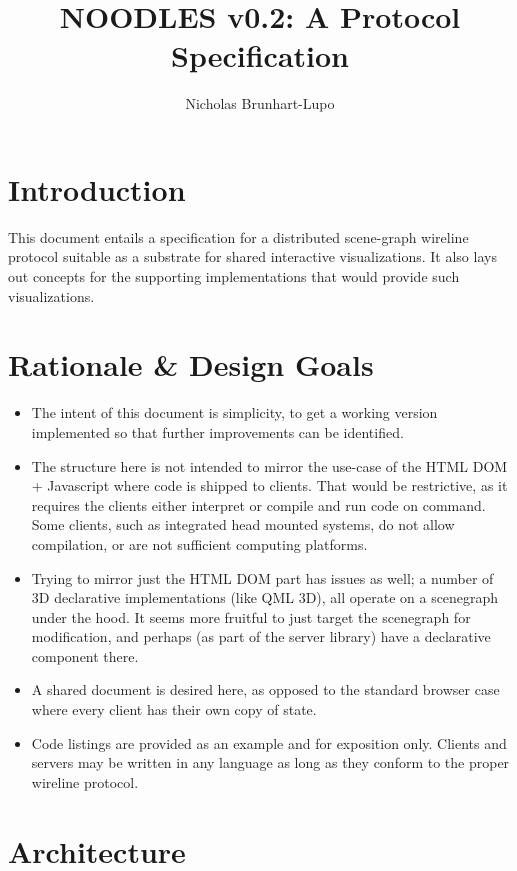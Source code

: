 \documentclass[11pt, oneside]{amsart}
\title{NOODLES v0.2: A Protocol Specification}
\author{Nicholas Brunhart-Lupo}
\begin{document}
\maketitle
\tableofcontents

\section{Introduction}

This document entails a specification for a distributed scene-graph wireline protocol suitable as a substrate for shared interactive visualizations. It also lays out concepts for the supporting implementations that would provide such visualizations.


\section{Rationale \& Design Goals}

\begin{itemize}
\item The intent of this document is simplicity, to get a working version implemented so that further improvements can be identified.
\item The structure here is not intended to mirror the use-case of the HTML DOM + Javascript where code is shipped to clients. That would be restrictive, as it requires the clients either interpret or compile and run code on command. Some clients, such as integrated head mounted systems, do not allow compilation, or are not sufficient computing platforms.
\item Trying to mirror just the HTML DOM part has issues as well; a number of 3D declarative implementations (like QML 3D), all operate on a scenegraph under the hood. It seems more fruitful to just target the scenegraph for modification, and perhaps (as part of the server library) have a declarative component there.
\item A shared document is desired here, as opposed to the standard browser case where every client has their own copy of state.
\item Code listings are provided as an example and for exposition only. Clients and servers may be written in any language as long as they conform to the proper wireline protocol.
\end{itemize}


\section{Architecture}
\end{document}
